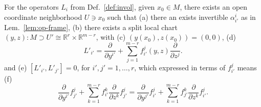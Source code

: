 \begin{lemma} \label{lem:loc-init-split}
For the operators $L_i$ from Def.~\ref{def:invol}, given $x_0 \in M$, there exists
an open coordinate neighborhood $U\ni x_0$ such that (a) there an exists invertible
$\alpha_{i'}^i$ as in Lem.~\ref{lem:op-frame}, (b) there exists a split local
chart $(y,z)\colon M \supset U' \cong \mathbb{R}^r \times \mathbb{R}^{m-r}$, with
(c) $(y(x_0),z(x_0)) = (0,0)$, (d)
\[
  L'_{i'} = \frac{\partial}{\partial y^{i'}} + \sum_{j=1}^{m-r} f_{i'}^j(y,z) \frac{\partial}{\partial z^j} .
\]
and (e) $[L'_{i'}, L'_{j'}] = 0$, for $i',j'=1,\ldots,r$, which expressed in terms of $f_{i'}^j$ means (f)
\[
  \frac{\partial}{\partial y^{i'}} f_{j'}^j
    + \sum_{k=1}^{m-r} f_{i'}^k \frac{\partial}{\partial z^k} f_{j'}^j
  = \frac{\partial}{\partial y^{j'}} f_{i'}^j
    + \sum_{k=1}^{m-r} f_{j'}^k \frac{\partial}{\partial z^k} f_{i'}^j .
\]
\end{lemma}
